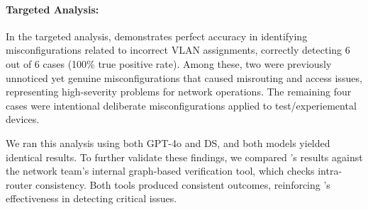 \paragraph{Targeted Analysis:} 
In the targeted analysis, \sysname{} demonstrates perfect accuracy in identifying misconfigurations related to incorrect VLAN assignments, correctly detecting 6 out of 6 cases (100\% true positive rate).  Among these, two were previously unnoticed yet genuine misconfigurations that caused misrouting and access issues, representing high-severity problems for network operations.
The remaining four cases were intentional deliberate misconfigurations applied to test/experiemental devices.

We ran this analysis using both GPT-4o and DS, and both models yielded identical results. To further validate these findings, we compared \sysname{}'s results against the network team’s internal graph-based verification tool, which checks intra-router consistency. Both tools produced consistent outcomes, reinforcing \sysname{}'s effectiveness in detecting critical issues. 



